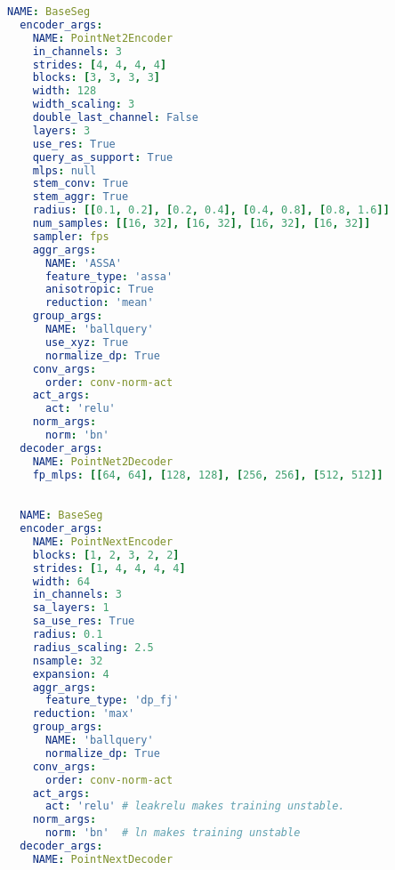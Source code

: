 \begin{minipage}{\linewidth}
\begin{lstlisting}[language=yaml, caption=\textbf{AssaNet Configuration}, label=lst:assanet_config]
  NAME: BaseSeg
  encoder_args:
    NAME: PointNet2Encoder
    in_channels: 3
    strides: [4, 4, 4, 4]
    blocks: [3, 3, 3, 3]
    width: 128
    width_scaling: 3
    double_last_channel: False
    layers: 3
    use_res: True 
    query_as_support: True
    mlps: null 
    stem_conv: True
    stem_aggr: True
    radius: [[0.1, 0.2], [0.2, 0.4], [0.4, 0.8], [0.8, 1.6]]
    num_samples: [[16, 32], [16, 32], [16, 32], [16, 32]]
    sampler: fps
    aggr_args:
      NAME: 'ASSA'
      feature_type: 'assa'
      anisotropic: True 
      reduction: 'mean'
    group_args:
      NAME: 'ballquery'
      use_xyz: True
      normalize_dp: True
    conv_args:
      order: conv-norm-act
    act_args:
      act: 'relu'
    norm_args:
      norm: 'bn'
  decoder_args:
    NAME: PointNet2Decoder
    fp_mlps: [[64, 64], [128, 128], [256, 256], [512, 512]]
\end{lstlisting}
\end{minipage}




\begin{minipage}{\linewidth}
\begin{lstlisting}[language=yaml, caption=\textbf{PointNeXt Configuration}, label=lst:pointnext_config]

  NAME: BaseSeg
  encoder_args:
    NAME: PointNextEncoder
    blocks: [1, 2, 3, 2, 2]
    strides: [1, 4, 4, 4, 4]
    width: 64
    in_channels: 3
    sa_layers: 1
    sa_use_res: True
    radius: 0.1
    radius_scaling: 2.5
    nsample: 32
    expansion: 4
    aggr_args:
      feature_type: 'dp_fj'
    reduction: 'max'
    group_args:
      NAME: 'ballquery'
      normalize_dp: True
    conv_args:
      order: conv-norm-act
    act_args:
      act: 'relu' # leakrelu makes training unstable.
    norm_args:
      norm: 'bn'  # ln makes training unstable
  decoder_args:
    NAME: PointNextDecoder
\end{lstlisting}
\end{minipage}



